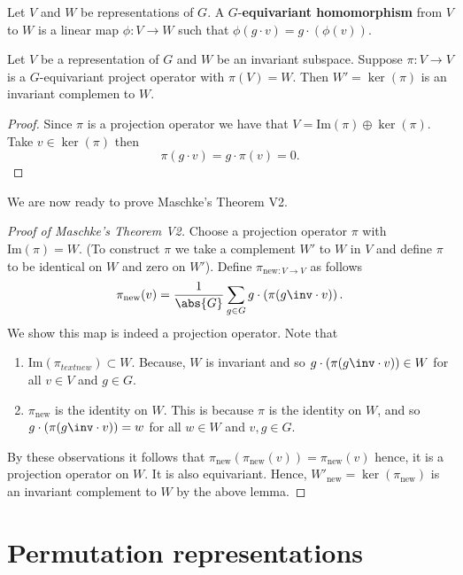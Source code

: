 \documentclass[12pt, a4paper]{article}
\begin{document}
\begin{definition}
    Let \(V\) and \(W\) be representations of \(G\). A \(G\)-\textbf{equivariant homomorphism} from \(V\) to \(W\) is a linear map \(\phi:V \to W\) such that \(\phi(g\cdot v)=g\cdot (\phi(v))\).
\end{definition}

\begin{lemma}
    Let \(V\) be a representation of \(G\) and \(W\) be an invariant subspace. Suppose \(\pi:V \to V\) is a \(G\)-equivariant project operator with \(\pi(V)=W\). Then \(W'=\ker(\pi)\) is an invariant complemen to \(W\).
\end{lemma}

\begin{proof}
    Since \(\pi\) is a projection operator we have that \(V =\text{Im}(\pi)\oplus \ker(\pi)\). Take \(v\in \ker(\pi)\) then 
    \[\pi(g\cdot v)=g\cdot \pi(v)=0.\]
\end{proof}

\noindent We are now ready to prove Maschke's Theorem V2.

\begin{proof}[Proof of Maschke's Theorem V2]
    Choose a projection operator \(\pi\) with \(\text{Im}(\pi)=W\). (To construct \(\pi\) we take a complement \(W'\) to \(W\) in \(V\) and define \(\pi\) to be identical on \(W\) and zero on \(W'\)). Define \(\pi_{\text{new}:V \to V}\) as follows
    \[\pi_{\text{new}}(v) = \frac{1}{\abs{G}} \sum_{g\in G} g\cdot \left( \pi(g\inv \cdot v) \right).\]
    We show this map is indeed a projection operator. Note that 
    \begin{enumerate}
        \item \(\text{Im}(\pi_{text{new}})\subset W\). Because, \(W\) is invariant and so \(g\cdot \left( \pi(g\inv \cdot v) \right) \in W\) for all \(v \in V\) and \(g\in G\).
        \item \(\pi_{\text{new}}\) is the identity on \(W\). This is because \(\pi\) is the identity on \(W\), and so \(g\cdot \left( \pi(g\inv \cdot v) \right) =w\) for all \(w\in W\) and \(v,g \in G\).
    \end{enumerate}
    By these observations it follows that \(\pi_{\text{new}}(\pi_{\text{new}}(v))=\pi_{\text{new}}(v)\) hence, it is a projection operator on \(W\). It is also equivariant. Hence, \(W'_{\text{new}}=\ker(\pi_{\text{new}})\) is an invariant complement to \(W\) by the above lemma.
\end{proof}

\section{Permutation representations}
\end{document}
